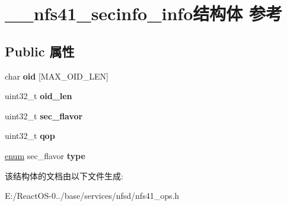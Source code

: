 \hypertarget{struct____nfs41__secinfo__info}{}\section{\+\_\+\+\_\+nfs41\+\_\+secinfo\+\_\+info结构体 参考}
\label{struct____nfs41__secinfo__info}
\subsection*{Public 属性}
\begin{DoxyCompactItemize}
\item 
\mbox{\label{struct____nfs41__secinfo__info_a2e961b1febf430c40caf534c7f9eb778}} 
char {\bfseries oid} \mbox{[}M\+A\+X\+\_\+\+O\+I\+D\+\_\+\+L\+EN\mbox{]}
\item 
\mbox{\label{struct____nfs41__secinfo__info_aa00149e8d8663ed132e95280aafd17bc}} 
uint32\+\_\+t {\bfseries oid\+\_\+len}
\item 
\mbox{\label{struct____nfs41__secinfo__info_a8b7952dcdb9f71e377d82eddab169ce6}} 
uint32\+\_\+t {\bfseries sec\+\_\+flavor}
\item 
\mbox{\label{struct____nfs41__secinfo__info_a4af5b0aaf2daebdf6cfc834f9ed8013c}} 
uint32\+\_\+t {\bfseries qop}
\item 
\mbox{\label{struct____nfs41__secinfo__info_a4dcbf3715245e0710f71c0b62a61d09e}} 
\hyperlink{interfaceenum}{enum} sec\+\_\+flavor {\bfseries type}
\end{DoxyCompactItemize}


该结构体的文档由以下文件生成\+:\begin{DoxyCompactItemize}
\item 
E\+:/\+React\+O\+S-\/0../base/services/nfsd/nfs41\+\_\+ops.\+h\end{DoxyCompactItemize}
